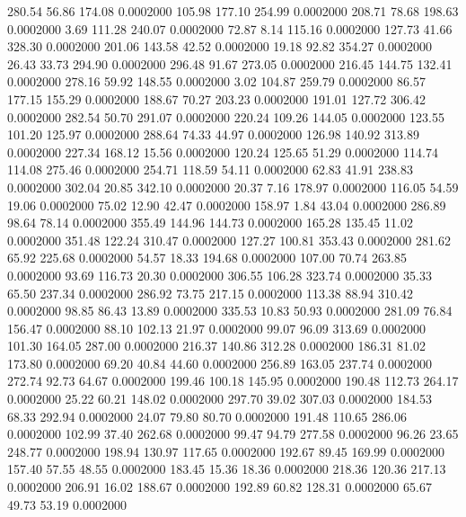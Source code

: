  280.54   56.86  174.08   0.0002000
 105.98  177.10  254.99   0.0002000
 208.71   78.68  198.63   0.0002000
   3.69  111.28  240.07   0.0002000
  72.87    8.14  115.16   0.0002000
 127.73   41.66  328.30   0.0002000
 201.06  143.58   42.52   0.0002000
  19.18   92.82  354.27   0.0002000
  26.43   33.73  294.90   0.0002000
 296.48   91.67  273.05   0.0002000
 216.45  144.75  132.41   0.0002000
 278.16   59.92  148.55   0.0002000
   3.02  104.87  259.79   0.0002000
  86.57  177.15  155.29   0.0002000
 188.67   70.27  203.23   0.0002000
 191.01  127.72  306.42   0.0002000
 282.54   50.70  291.07   0.0002000
 220.24  109.26  144.05   0.0002000
 123.55  101.20  125.97   0.0002000
 288.64   74.33   44.97   0.0002000
 126.98  140.92  313.89   0.0002000
 227.34  168.12   15.56   0.0002000
 120.24  125.65   51.29   0.0002000
 114.74  114.08  275.46   0.0002000
 254.71  118.59   54.11   0.0002000
  62.83   41.91  238.83   0.0002000
 302.04   20.85  342.10   0.0002000
  20.37    7.16  178.97   0.0002000
 116.05   54.59   19.06   0.0002000
  75.02   12.90   42.47   0.0002000
 158.97    1.84   43.04   0.0002000
 286.89   98.64   78.14   0.0002000
 355.49  144.96  144.73   0.0002000
 165.28  135.45   11.02   0.0002000
 351.48  122.24  310.47   0.0002000
 127.27  100.81  353.43   0.0002000
 281.62   65.92  225.68   0.0002000
  54.57   18.33  194.68   0.0002000
 107.00   70.74  263.85   0.0002000
  93.69  116.73   20.30   0.0002000
 306.55  106.28  323.74   0.0002000
  35.33   65.50  237.34   0.0002000
 286.92   73.75  217.15   0.0002000
 113.38   88.94  310.42   0.0002000
  98.85   86.43   13.89   0.0002000
 335.53   10.83   50.93   0.0002000
 281.09   76.84  156.47   0.0002000
  88.10  102.13   21.97   0.0002000
  99.07   96.09  313.69   0.0002000
 101.30  164.05  287.00   0.0002000
 216.37  140.86  312.28   0.0002000
 186.31   81.02  173.80   0.0002000
  69.20   40.84   44.60   0.0002000
 256.89  163.05  237.74   0.0002000
 272.74   92.73   64.67   0.0002000
 199.46  100.18  145.95   0.0002000
 190.48  112.73  264.17   0.0002000
  25.22   60.21  148.02   0.0002000
 297.70   39.02  307.03   0.0002000
 184.53   68.33  292.94   0.0002000
  24.07   79.80   80.70   0.0002000
 191.48  110.65  286.06   0.0002000
 102.99   37.40  262.68   0.0002000
  99.47   94.79  277.58   0.0002000
  96.26   23.65  248.77   0.0002000
 198.94  130.97  117.65   0.0002000
 192.67   89.45  169.99   0.0002000
 157.40   57.55   48.55   0.0002000
 183.45   15.36   18.36   0.0002000
 218.36  120.36  217.13   0.0002000
 206.91   16.02  188.67   0.0002000
 192.89   60.82  128.31   0.0002000
  65.67   49.73   53.19   0.0002000
